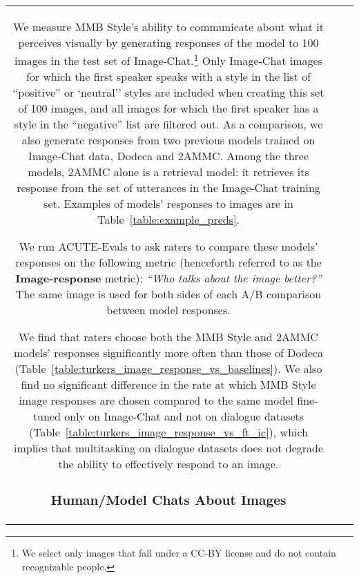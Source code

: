 \documentclass[11pt,a4paper]{article}
\begin{document}
\begin{table*}[t!]
\begin{adjustbox}{center=15.5cm}
\begin{small}
\begin{tabular*}{\textwidth}{ccl}
We measure MMB Style's ability to communicate about what it perceives visually by generating responses of the model to 100 images in the test set of Image-Chat.\footnote{We select only images that fall under a CC-BY license and do not contain recognizable people.} Only Image-Chat images for which the first speaker speaks with a style in the list of ``positive'' or `neutral'' styles are included when creating this set of 100 images, and all images for which the first speaker has a style in the ``negative'' list are filtered out. As a comparison, we also generate responses from two previous models trained on Image-Chat data, Dodeca and 2AMMC. Among the three models, 2AMMC alone is a retrieval model: it retrieves its response from the set of utterances in the Image-Chat training set. Examples of models' responses to images are in Table~\ref{table:example_preds}. 

We run ACUTE-Evals to ask raters to compare these models' responses on the following metric (henceforth referred to as the \textbf{Image-response} metric): \textit{``Who talks about the image better?''} The same image is used for both sides of each A/B comparison between model responses.

We find that raters choose both the MMB Style and 2AMMC models' responses significantly more often than those of Dodeca (Table~\ref{table:turkers_image_response_vs_baselines}). We also find no significant difference in the rate at which MMB Style image responses are chosen compared to the same model fine-tuned only on Image-Chat and not on dialogue datasets (Table~\ref{table:turkers_image_response_vs_ft_ic}), which implies that multitasking on dialogue datasets does not degrade the ability to effectively respond to an image.

\subsubsection{Human/Model Chats About Images}
\label{sec:human_eval_image_chat}


\end{tabular*}
\end{small}
\end{adjustbox}
\end{table*}
\end{document}
